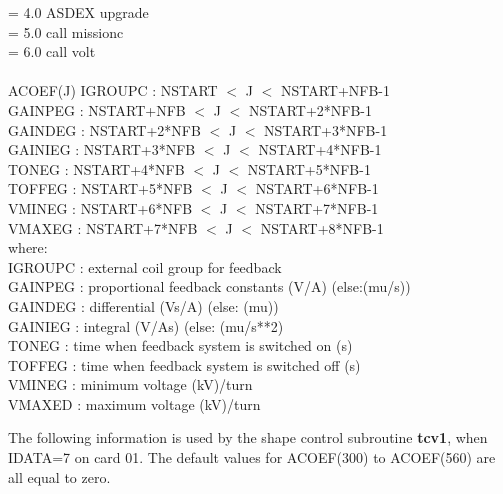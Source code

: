 \begin{tabbing}
           \>= 4.0 \> ASDEX upgrade  \\
           \>= 5.0 \> call missionc \\
           \>= 6.0 \> call volt \\
 \\
\label{p:vback2}
ACOEF(J) \>  IGROUPC : \> NSTART       \> $<$  \> J  \> $<$ \> NSTART+NFB-1 \\
         \>  GAINPEG :  \> NSTART+NFB   \> $<$  \> J  \> $<$ \> NSTART+2*NFB-1\\
         \>  GAINDEG :  \> NSTART+2*NFB \> $<$  \> J  \> $<$ \> NSTART+3*NFB-1\\
         \>  GAINIEG :  \> NSTART+3*NFB \> $<$  \> J  \> $<$ \> NSTART+4*NFB-1\\
         \>  TONEG :  \> NSTART+4*NFB \> $<$  \> J  \> $<$ \> NSTART+5*NFB-1\\
         \>  TOFFEG :  \> NSTART+5*NFB \> $<$  \> J  \> $<$ \> NSTART+6*NFB-1\\
         \>  VMINEG :  \> NSTART+6*NFB \> $<$  \> J  \> $<$ \> NSTART+7*NFB-1\\
         \>  VMAXEG :  \> NSTART+7*NFB \> $<$  \> J  \> $<$ \> NSTART+8*NFB-1\\
where:\\
\>  IGROUPC : \> external coil group for feedback\\
\>  GAINPEG : \> proportional feedback constants (V/A) (else:(mu/s))\\
\>  GAINDEG : \> differential (Vs/A) (else: (mu))\\
\>  GAINIEG : \> integral (V/As) (else: (mu/s**2)\\
\>  TONEG : \> time when feedback system is switched on (s)\\
\>  TOFFEG : \> time when feedback system is switched off (s)\\
\>  VMINEG : \> minimum voltage (kV)/turn\\
\>  VMAXED : \> maximum voltage (kV)/turn
\end{tabbing}
The following information is used by the shape control subroutine {\bf tcv1}, when IDATA=7 
on card 01.  The default values for ACOEF(300) to ACOEF(560) are all equal to zero.
